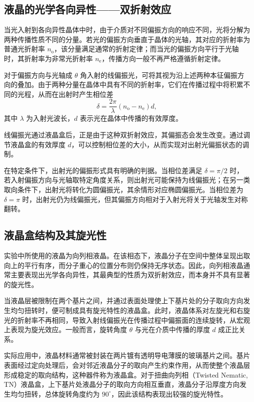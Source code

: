\documentclass[a4paper, 1.5lines]{ctexart}
\begin{document}
       \subsection{液晶的光学各向异性——双折射效应}
        当光入射到各向异性晶体中时，由于介质对不同偏振方向的响应不同，光将分解为两种传播性质不同的分量。若光的偏振方向垂直于晶体的光轴，其对应的折射率为普通光折射率 $n_{\mathrm{o}}$，该分量满足通常的折射定律；而当光的偏振方向平行于光轴时，其折射率为非常光折射率 $n_{\mathrm{e}}$，传播方向一般不再严格遵循折射定律。

对于偏振方向与光轴成 $\theta$ 角入射的线偏振光，可将其视为沿上述两种本征偏振方向的叠加。由于两种分量在晶体中具有不同的折射率，它们在传播过程中将积累不同的光程，从而在出射时产生相位差
\begin{equation}
    \delta = \dfrac{2\pi}{\lambda}(n_{\mathrm{o}} - n_{\mathrm{e}}) d ,
\end{equation}
其中 $\lambda$ 为入射光波长，$d$ 表示光在晶体中传播的有效厚度。

线偏振光通过液晶盒后，正是由于这种双折射效应，其偏振态会发生改变。通过调节液晶盒的有效厚度 $d$，可以控制相位差的大小，从而实现对出射光偏振状态的调制。

在特定条件下，出射光的偏振形式具有明确的判据。当相位差满足 $\delta = \pi/2$ 时，若入射偏振方向与光轴取特定角度关系，则出射光可能保持为线偏振光；在另一类取向条件下，出射光将转化为圆偏振光，其余情形对应椭圆偏振光。当相位差为 $\delta = \pi$ 时，出射光仍为线偏振光，但其偏振方向相对于入射光将关于光轴发生对称翻转。
        \subsection{液晶盒结构及其旋光性}
        实验中所使用的液晶为向列相液晶。在该相态下，液晶分子在空间中整体呈现出取向上的平行有序，而分子重心的位置分布则仍保持无序状态。因此，向列相液晶通常主要表现出光学各向异性，其最典型的性质为双折射效应，而本身并不具有显著的旋光性。

当液晶层被限制在两个基片之间，并通过表面处理使上下基片处的分子取向方向发生均匀扭转时，便可制成具有旋光特性的液晶盒。此时，液晶体系对左旋光和右旋光的折射率不再相同，导致入射线偏振光在传播过程中偏振面的连续旋转，从宏观上表现为旋光效应。一般而言，旋转角度 $\theta$ 与光在介质中传播的厚度 $d$ 成正比关系。

实际应用中，液晶材料通常被封装在两片镀有透明导电薄膜的玻璃基片之间。基片表面经过定向处理后，会对邻近液晶分子的取向产生约束作用，从而使整个液晶层形成稳定的取向结构，这种器件称为液晶盒。对于扭曲向列相（Twisted Nematic, TN）液晶盒，上下基片处液晶分子的取向方向相互垂直，液晶分子沿厚度方向发生均匀扭转，总体旋转角度约为 $90^\circ$，因此该结构表现出较强的旋光特性。
\end{document}
